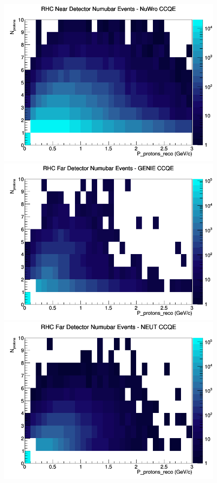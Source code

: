 \documentclass[12pt]{article}
\begin{document}
\begin{figure}[h]
\includegraphics[width=\linewidth]{eff_N_P/GAr/protons/CCQE_RHC_ND_numubar_N_P_NuWro.png}
\endminipage
\newline
{}
\includegraphics[width=\linewidth]{eff_N_P/GAr/protons/CCQE_RHC_FD_numubar_N_P_GENIE.png}
\endminipage
{}
\includegraphics[width=\linewidth]{eff_N_P/GAr/protons/CCQE_RHC_FD_numubar_N_P_NEUT.png}

\end{figure}
\end{document}
